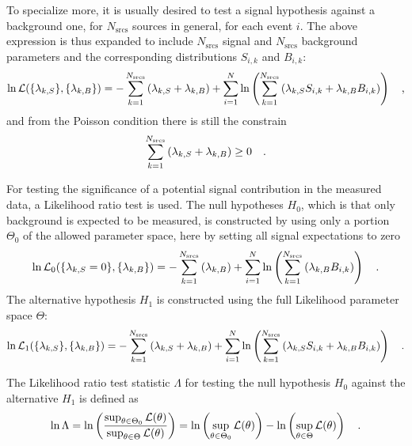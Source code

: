 To specialize more, it is usually desired to test a signal hypothesis against a background one, for $N_\text{srcs}$ sources in general, for each event $i$.
The above expression is thus expanded to include $N_\text{srcs}$ signal and $N_\text{srcs}$ background parameters and the corresponding distributions $S_{i,k}$ and $B_{i,k}$:
\begin{equation}
  \ln\mathcal{L}(\{\lambda_{k,S}\}, \{\lambda_{k,B}\})
  = -\sum_{k=1}^{N_\text{srcs}}\left(\lambda_{k,S}+\lambda_{k,B}\right) +
    \sum_{i=1}^N \ln\left(\sum_{k=1}^{N_\text{srcs}}\left(
      \lambda_{k,S} S_{i,k}+\lambda_{k,B} B_{i,k}\right)\right)
  \quad\text{,}
\end{equation}
and from the Poisson condition there is still the constrain
\begin{equation}
  \sum_{k=1}^{N_\text{srcs}}\left(\lambda_{k,S}+\lambda_{k,B}\right) \geq 0
  \quad\text{.}
\end{equation}

For testing the significance of a potential signal contribution in the measured data, a Likelihood ratio test is used.
The null hypotheses $H_0$, which is that only background is expected to be measured, is constructed by using only a portion $\Theta_0$ of the allowed parameter space, here by setting all signal expectations to zero
\begin{equation}
  \ln\mathcal{L}_0(\{\lambda_{k,S}=0\}, \{\lambda_{k,B}\})
  = -\sum_{k=1}^{N_\text{srcs}}\left(\lambda_{k,B}\right) +
    \sum_{i=1}^N \ln\left(\sum_{k=1}^{N_\text{srcs}}\left(
      \lambda_{k,B} B_{i,k}\right)\right)
  \quad\text{.}
\end{equation}
The alternative hypothesis $H_1$ is constructed using the full Likelihood parameter space $\Theta$:
\begin{equation}
  \ln\mathcal{L}_1(\{\lambda_{k,S}\}, \{\lambda_{k,B}\})
  = -\sum_{k=1}^{N_\text{srcs}}\left(\lambda_{k,S}+
                                     \lambda_{k,B}\right) +
    \sum_{i=1}^N \ln\left(\sum_{k=1}^{N_\text{srcs}}\left(
      \lambda_{k,S} S_{i,k}+\lambda_{k,B} B_{i,k}\right)\right)
  \quad\text{.}
\end{equation}

The Likelihood ratio test statistic $\Lambda$ for testing the null hypothesis $H_0$ against the alternative $H_1$ is defined as 
\begin{equation}
  \ln\Lambda = \ln\left(\frac{\sup_{\theta \in \Theta_0} \mathcal{L}(\theta)}
                          {\sup_{\theta \in \Theta} \mathcal{L}(\theta)}\right)
  = \ln\left(\sup_{\theta \in \Theta_0} \mathcal{L}(\theta)\right) -
    \ln\left(\sup_{\theta \in \Theta} \mathcal{L}(\theta)\right)
  \quad\text{.}
\end{equation}

